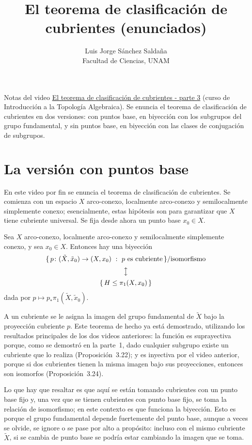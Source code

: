 \documentclass[11pt]{article}
\title{El teorema de clasificación de cubrientes (enunciados)}
\author{Luis Jorge Sánchez Saldaña\\[2pt]\small Facultad de Ciencias, UNAM}
\date{}
\begin{document}
\maketitle

\noindent\small Notas del video
\href{https://www.youtube.com/watch?v=TB2vyYDi8JQ}{\guillemotleft{}El teorema de clasificación de cubrientes - parte 3\guillemotright{}}
(curso de Introducción a la Topología Algebraica). Se enuncia el teorema de clasificación de cubrientes en dos versiones: con puntos base, en biyección con los subgrupos del grupo fundamental, y sin puntos base, en biyección con las clases de conjugación de subgrupos.
\normalsize

\section*{La versión con puntos base}

En este video por fin se enuncia el teorema de clasificación de cubrientes. Se comienza con un espacio $X$ arco-conexo, localmente arco-conexo y semilocalmente simplemente conexo; esencialmente, estas hipótesis son para garantizar que $X$ tiene cubriente universal. Se fija desde ahora un punto base $x_0\in X$.

\begin{teo}\label{teo:clasificacion-base}
Sea $X$ arco-conexo, localmente arco-conexo y semilocalmente simplemente conexo, y sea $x_0\in X$. Entonces hay una biyección
\[
  \begin{gathered}\{\,p\colon(\tilde X,\tilde x_0)\to(X,x_0)\ :\ p\text{ es cubriente}\,\}/\text{isomorfismo}\\[2pt] \big\updownarrow\\[2pt] \{\,H\le\pi_1(X,x_0)\,\}\end{gathered}
\]
dada por $p\longmapsto p_*\pi_1(\tilde X,\tilde x_0)$.
\end{teo}

A un cubriente se le asigna la imagen del grupo fundamental de $\tilde X$ bajo la proyección cubriente $p$. Este teorema de hecho ya está demostrado, utilizando los resultados principales de los dos videos anteriores: la función es suprayectiva porque, como se demostró en la parte~1, dado cualquier subgrupo existe un cubriente que lo realiza (Proposición~3.22); y es inyectiva por el video anterior, porque si dos cubrientes tienen la misma imagen bajo sus proyecciones, entonces son isomorfos (Proposición~3.24).

Lo que hay que resaltar es que aquí se están tomando cubrientes con un punto base fijo y, una vez que se tienen cubrientes con punto base fijo, se toma la relación de isomorfismo; en este contexto es que funciona la biyección. Esto es porque el grupo fundamental depende fuertemente del punto base, aunque a veces se olvide, se ignore o se pase por alto a propósito: incluso con el mismo cubriente $\tilde X$, si se cambia de punto base se podría estar cambiando la imagen que se toma.
\end{document}
